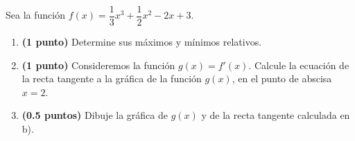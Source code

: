 
Sea la función $f(x)=\dfrac{1}{3}x^3+\dfrac{1}{2}x^2-2x+3$.
\begin{enumerate}[label=\alph*)]
\item \textbf{(1 punto)} Determine sus máximos y mínimos relativos.
\item \textbf{(1 punto)} Consideremos la función $g(x)=f'(x)$. Calcule la ecuación de la recta tangente a la gráfica de la función $g(x)$, en el punto de abscisa $x=2$.
\item \textbf{(0.5 puntos)} Dibuje la gráfica de $g(x)$ y de la recta tangente calculada en b).
\end{enumerate}
